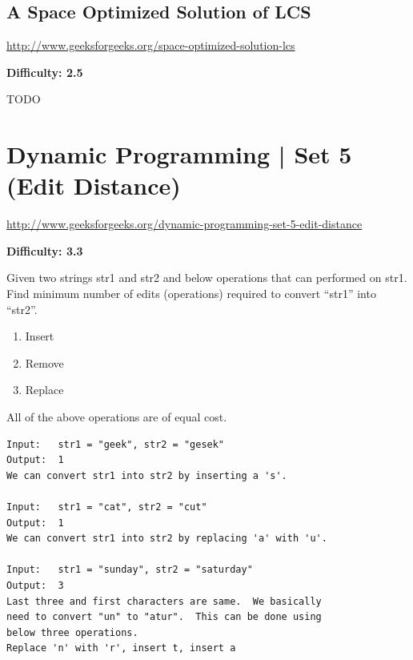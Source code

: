 \subsection{A Space Optimized Solution of LCS
  \label{secGFGDPLCSSpaceOptimized}}

\url{http://www.geeksforgeeks.org/space-optimized-solution-lcs}

\textbf{Difficulty: 2.5}

TODO


\section{Dynamic Programming | Set 5 (Edit Distance)
  \label{secGFGDPSet5EditDistance}}

\url{http://www.geeksforgeeks.org/dynamic-programming-set-5-edit-distance}

\textbf{Difficulty: 3.3}

Given two strings str1 and str2 and below operations that can performed on
str1. Find minimum number of edits (operations) required to convert ``str1''
into ``str2''.
\begin{enumerate}[label=\textbf{\alph*.}]
\item Insert
\item Remove
\item Replace
\end{enumerate}
All of the above operations are of equal cost.

\begin{mdframed}[style=mdfNOTE,
frametitle={Examples:}]
\begin{lstlisting}[style=raygeneric]
Input:   str1 = "geek", str2 = "gesek"
Output:  1
We can convert str1 into str2 by inserting a 's'.

Input:   str1 = "cat", str2 = "cut"
Output:  1
We can convert str1 into str2 by replacing 'a' with 'u'.

Input:   str1 = "sunday", str2 = "saturday"
Output:  3
Last three and first characters are same.  We basically
need to convert "un" to "atur".  This can be done using
below three operations. 
Replace 'n' with 'r', insert t, insert a
\end{lstlisting}
\end{mdframed}

